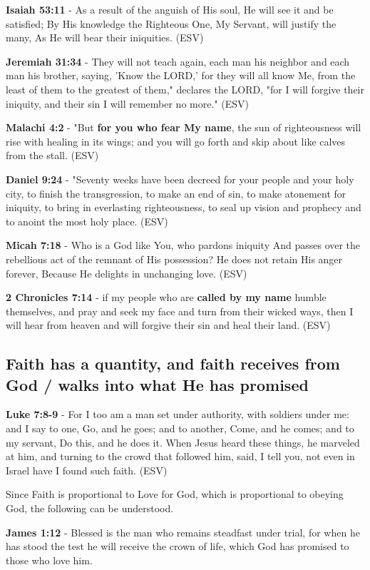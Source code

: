 \documentclass[11pt]{article}
\begin{document}
\textbf{Isaiah 53:11} - As a result of the anguish of His soul, He will see it and be satisfied; By His knowledge the Righteous One, My Servant, will justify the many, As He will bear their iniquities. (ESV)

\textbf{Jeremiah 31:34} - They will not teach again, each man his neighbor and each man his brother, saying, 'Know the LORD,' for they will all know Me, from the least of them to the greatest of them," declares the LORD, "for I will forgive their iniquity, and their sin I will remember no more." (ESV)

\textbf{Malachi 4:2} - "But \textbf{for you who fear My name}, the sun of righteousness will rise with healing in its wings; and you will go forth and skip about like calves from the stall. (ESV)

\textbf{Daniel 9:24} - "Seventy weeks have been decreed for your people and your holy city, to finish the transgression, to make an end of sin, to make atonement for iniquity, to bring in everlasting righteousness, to seal up vision and prophecy and to anoint the most holy place. (ESV)

\textbf{Micah 7:18} - Who is a God like You, who pardons iniquity And passes over the rebellious act of the remnant of His possession? He does not retain His anger forever, Because He delights in unchanging love. (ESV)

\textbf{2 Chronicles 7:14} - if my people who are \textbf{called by my name} humble themselves, and pray and seek my face and turn from their wicked ways, then I will hear from heaven and will forgive their sin and heal their land. (ESV)

\subsection{Faith has a quantity, and faith receives from God / walks into what He has promised}
\label{sec:orge9db1ac}
\textbf{Luke 7:8-9} - For I too am a man set under authority, with soldiers under me: and I say to one, Go, and he goes; and to another, Come, and he comes; and to my servant, Do this, and he does it. When Jesus heard these things, he marveled at him, and turning to the crowd that followed him, said, I tell you, not even in Israel have I found such faith. (ESV)

Since Faith is proportional to Love for God, which is proportional to obeying God, the following can be understood.

\textbf{James 1:12} - Blessed is the man who remains steadfast under trial, for when he has stood the test he will receive the crown of life, which God has promised to those who love him.
\end{document}

